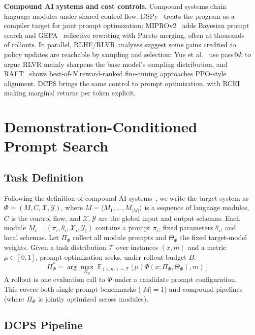 \documentclass[runningheads]{llncs}
\begin{document}
\textbf{Compound AI systems and cost controls.} Compound systems chain language modules under shared control flow. DSPy~\cite{dspy} treats the program as a compiler target for joint prompt optimization; MIPROv2~\cite{opsahl2024mipro} adds Bayesian prompt search and GEPA~\cite{gepa} reflective rewriting with Pareto merging, often at thousands of rollouts. In parallel, RLHF/RLVR analyses suggest some gains credited to policy updates are reachable by sampling and selection: Yue et al.~\cite{yue2025rlvr} use pass@$k$ to argue RLVR mainly sharpens the base model's sampling distribution, and RAFT~\cite{dong2023raft} shows best-of-$N$ reward-ranked fine-tuning approaches PPO-style alignment. DCPS brings the same control to prompt optimization, with RCEI making marginal returns per token explicit.


\section{Demonstration-Conditioned Prompt Search}

\subsection{Task Definition}
Following the definition of compound AI systems~\cite{dspy,gepa}, we write the target system as $\Phi=(M,C,\mathcal{X},\mathcal{Y})$, where $M=\langle M_1,\ldots,M_{|M|}\rangle$ is a sequence of language modules, $C$ is the control flow, and $\mathcal{X},\mathcal{Y}$ are the global input and output schemas. Each module $M_i=(\pi_i,\theta_i,\mathcal{X}_i,\mathcal{Y}_i)$ contains a prompt $\pi_i$, fixed parameters $\theta_i$, and local schemas. Let $\Pi_\Phi$ collect all module prompts and $\Theta_\Phi$ the fixed target-model weights. Given a task distribution $\mathcal{T}$ over instances $(x,m)$ and a metric $\mu\in[0,1]$, prompt optimization seeks, under rollout budget $B$:
\begin{equation}
\Pi^*_\Phi = \arg\max_{\Pi_\Phi}\; \mathbb{E}_{(x,m)\sim\mathcal{T}}\left[\mu(\Phi(x;\Pi_\Phi,\Theta_\Phi),m)\right]
\end{equation}
A rollout is one evaluation call to $\Phi$ under a candidate prompt configuration. This covers both single-prompt benchmarks ($|M|=1$) and compound pipelines (where $\Pi_\Phi$ is jointly optimized across modules).

\subsection{DCPS Pipeline}
\label{sec:pipeline}
\end{document}
